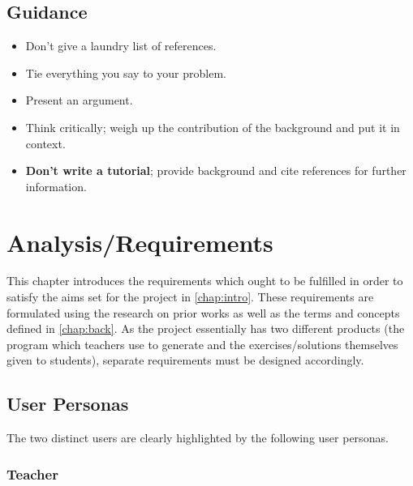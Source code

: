 \documentclass{l4proj}
\begin{document}
\section{Guidance}
\begin{itemize}    
    \item
      Don't give a laundry list of references.
    \item
      Tie everything you say to your problem.
    \item
      Present an argument.
    \item Think critically; weigh up the contribution of the background and put it in context.    
    \item
      \textbf{Don't write a tutorial}; provide background and cite
      references for further information.
\end{itemize}

\chapter{Analysis/Requirements}
\label{chap:req}

This chapter introduces the requirements which ought to be fulfilled in order to satisfy the aims set for the project in \autoref{chap:intro}. These requirements are formulated using the research on prior works as well as the terms and concepts defined in \autoref{chap:back}. As the project essentially has two different products (the program which teachers use to generate and the exercises/solutions themselves given to students), separate requirements must be designed accordingly.
\section{User Personas}

The two distinct users are clearly highlighted by the following user personas.

\subsection{Teacher}
\end{document}
